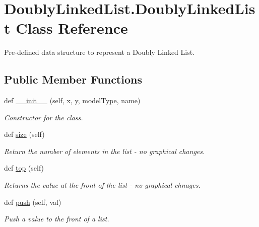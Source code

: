 \hypertarget{class_doubly_linked_list_1_1_doubly_linked_list}{}\section{Doubly\+Linked\+List.\+Doubly\+Linked\+List Class Reference}
\label{class_doubly_linked_list_1_1_doubly_linked_list}


Pre-\/defined data structure to represent a Doubly Linked List.  


\subsection*{Public Member Functions}
\begin{DoxyCompactItemize}
\item 
def \hyperlink{class_doubly_linked_list_1_1_doubly_linked_list_ac95a6951d6ef5b03c7d10286efc57e57}{\+\_\+\+\_\+init\+\_\+\+\_\+} (self, x, y, model\+Type, name)
\begin{DoxyCompactList}\small\item\em Constructor for the class. \end{DoxyCompactList}\item 
def \hyperlink{class_doubly_linked_list_1_1_doubly_linked_list_ab37ecd9e19fe37be77120401f6d3cf96}{size} (self)
\begin{DoxyCompactList}\small\item\em Return the number of elements in the list -\/ no graphical changes. \end{DoxyCompactList}\item 
\mbox{\label{class_doubly_linked_list_1_1_doubly_linked_list_a52fd8c452034ef2cde5b71c9550bcdad}} 
def \hyperlink{class_doubly_linked_list_1_1_doubly_linked_list_a52fd8c452034ef2cde5b71c9550bcdad}{top} (self)
\begin{DoxyCompactList}\small\item\em Returns the value at the front of the list -\/ no graphical chnages. \end{DoxyCompactList}\item 
def \hyperlink{class_doubly_linked_list_1_1_doubly_linked_list_ae354e2955360e6c04a9c3af7e3f268a2}{push} (self, val)
\begin{DoxyCompactList}\small\item\em Push a value to the front of a list. \end{DoxyCompactList}\item 

\end{DoxyCompactItemize}
